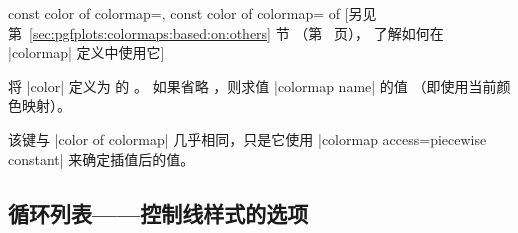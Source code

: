 \begin{pgfplotskeylist}{%
    const color of colormap=,
    const color of colormap= of %
}
    [另见第~\ref{sec:pgfplots:colormaps:based:on:others} 节
    （第~\pageref{sec:pgfplots:colormaps:based:on:others} 页），
    了解如何在 |colormap| 定义中使用它]

    将 \tikzname{} |color| 定义为  的 。
    如果省略 ，则求值 |colormap name| 的值
    （即使用当前颜色映射）。

    该键与 |color of colormap| 几乎相同，只是它使用
    |colormap access=piecewise constant| 来确定插值后的值。
\end{pgfplotskeylist}


\subsection{循环列表——控制线样式的选项}
\label{sec:cycle:list}

